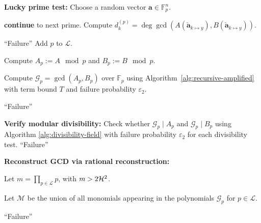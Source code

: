 \documentclass{article}
\numberwithin{equation}{section}
\begin{document}
\begin{algorithm}[p]
\begin{algorithmic}[1]





    \Statex \textbf{Lucky prime test:}
    \State Choose a random vector $\mathbf{a} \in \mathbb{F}_p^n$.

            \State \textbf{continue} to next prime.
        \EndIf
        \State Compute
        \(
        d^{(p)}_{k} = \deg \gcd(A(\mathbf{\check{a}}_{k \mapsto y} ), B(\mathbf{\check{a}}_{k \mapsto y} )).
        \)
    \EndFor

        \State \Return ``Failure''
        \State Add $p$ to $\mathcal{L}$. 

        \State Compute $A_p:=A \mod p$ and $B_p:=B \mod p$.
        
        \State Compute $\mathcal{G}_p = \gcd(A_p, B_p)$ over $\mathbb{F}_p$ using Algorithm~\ref{alg:recursive-amplified} with term bound $T$ and failure probability $\varepsilon_2$.
       
        \State \Return ``Failure''
           \EndIf

         \textbf{Verify modular divisibility:} 
         \State Check whether $\mathcal{G}_p \mid A_p$ and $\mathcal{G}_p \mid B_p$ using Algorithm \ref{alg:divisibility-field} with failure probability $\varepsilon_2$ for each divisibility test.
        \State \Return ``Failure''
          \EndIf
        
    \EndIf
\EndWhile



\Statex \textbf{Reconstruct GCD via rational reconstruction:}

\State Let $m = \prod_{p \in \mathcal{L}} p$, with $m > 2{\mathcal{H}}^2$.

\State Let $\mathcal{M}$ be the union of all monomials appearing in the polynomials $\mathcal{G}_p$ for $p \in \mathcal{L}$.

    \State \Return ``Failure''
\EndIf


\end{algorithmic}
\end{algorithm}
\end{document}
